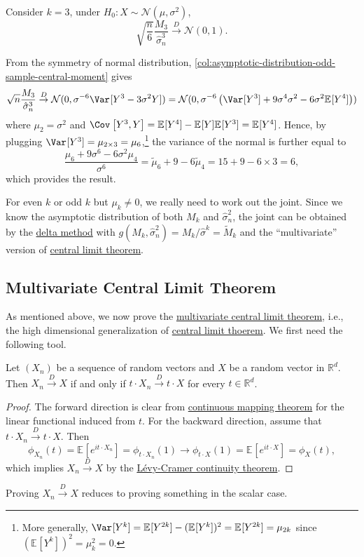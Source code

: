 \begin{eg}
	Consider \(k = 3\), under \(H_0 \colon X \sim \mathcal{N} (\mu , \sigma ^2)\),
	\[
		\sqrt{\frac{n}{6}} \frac{M_3}{\hat{\sigma} _n^3}
		\overset{D}{\to} \mathcal{N} (0, 1).
	\]
\end{eg}
\begin{explanation}
	From the symmetry of normal distribution, \autoref{col:asymptotic-distribution-odd-sample-central-moment} gives
	\[
		\sqrt{n} \frac{M_3}{\hat{\sigma} _n^3}
		\overset{D}{\to} \mathcal{N} (0, \sigma ^{-6} \Var_{}[Y^3 - 3 \sigma ^2 Y] )
		= \mathcal{N} (0, \sigma ^{-6} \left( \Var_{}[Y^3] + 9 \sigma ^4 \sigma ^2 - 6 \sigma ^2 \mathbb{E}_{}[Y^4] \right) )
	\]
	where  \(\mu _2 = \sigma ^2\) and \(\Cov_{}\left[Y^3 , Y\right] = \mathbb{E}_{}[Y^4] - \mathbb{E}_{}[Y] \mathbb{E}_{}[Y^3] = \mathbb{E}_{}[Y^4] \). Hence, by plugging \(\Var_{}[Y^3] = \mu _{2 \times 3} = \mu _6\),\footnote{More generally, \(\Var_{}[Y^k] = \mathbb{E}_{}[Y^{2k} ] - (\mathbb{E}_{}[Y^k] )^2 = \mathbb{E}_{}[Y^{2k} ] = \mu _{2k}\) since \((\mathbb{E}_{}[Y^k] )^2 = \mu _k^2 = 0\).} the variance of the normal is further equal to
	\[
		\frac{\mu _6 + 9 \sigma ^6 - 6 \sigma ^2 \mu _4}{\sigma ^6}
		= \widetilde{\mu} _6 + 9 - 6 \widetilde{\mu} _4
		= 15 + 9 - 6 \times 3
		= 6,
	\]
	which provides the result.
\end{explanation}

For even \(k\) or odd \(k\) but \(\mu _k \neq 0\), we really need to work out the joint. Since we know the asymptotic distribution of both \(M_k\) and \(\hat{\sigma} _n^2\), the joint can be obtained by the \hyperref[thm:delta-method]{delta method} with \(g(M_k , \hat{\sigma} _n^2) = M_k / \hat{\sigma} ^k = \widetilde{M} _k\) and the ``multivariate'' version of \hyperref[thm:CLT]{central limit theorem}.

\subsection{Multivariate Central Limit Theorem}
As mentioned above, we now prove the \hyperref[thm:multivariate-CLT]{multivariate central limit theorem}, i.e., the high dimensional generalization of \hyperref[thm:CLT]{central limit thoerem}. We first need the following tool.

\begin{theorem}\label{thm:Cramer-Wold-device}
	Let \((X_n)\) be a sequence of random vectors and \(X\) be a random vector in \(\mathbb{R} ^d\). Then \(X_n \overset{D}{\to} X\) if and only if \(t \cdot X_n \overset{D}{\to} t \cdot X\) for every \(t \in \mathbb{R} ^d\).
\end{theorem}
\begin{proof}
	The forward direction is clear from \hyperref[thm:continuous-mapping]{continuous mapping theorem} for the linear functional induced from \(t\). For the backward direction, assume that \(t \cdot X_n \overset{D}{\to} t \cdot X\). Then
	\[
		\phi _{X_n}(t)
		= \mathbb{E}_{}[e^{i t \cdot X_n}]
		= \phi _{t \cdot X_n}(1)
		\to \phi _{t \cdot X}(1)
		= \mathbb{E}_{}[e^{i t \cdot X}]
		= \phi _X(t),
	\]
	which implies \(X_n \overset{D}{\to} X\) by the \hyperref[thm:Levy-Cramer-continuity]{Lévy-Cramer continuity theorem}.
\end{proof}

\begin{remark}
	Proving \(X_n \overset{D}{\to} X\) reduces to proving something in the scalar case.
\end{remark}